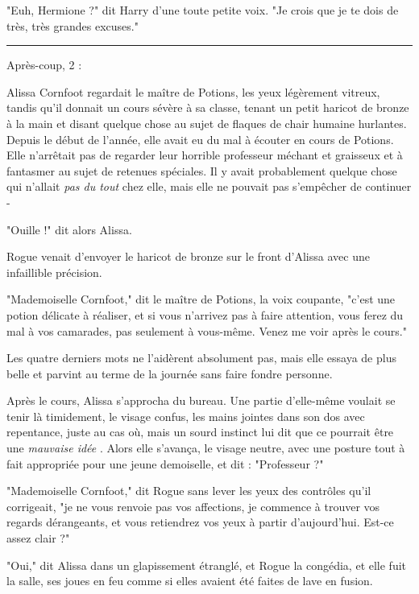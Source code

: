 "Euh, Hermione ?" dit Harry d'une toute petite voix. "Je crois que je te dois de très, très grandes excuses."
\par\noindent\rule{\textwidth}{0.4pt}
Après-coup, 2 :

Alissa Cornfoot regardait le maître de Potions, les yeux légèrement vitreux, tandis qu'il donnait un cours sévère à sa classe, tenant un petit haricot de bronze à la main et disant quelque chose au sujet de flaques de chair humaine hurlantes. Depuis le début de l'année, elle avait eu du mal à écouter en cours de Potions. Elle n'arrêtait pas de regarder leur horrible professeur méchant et graisseux et à fantasmer au sujet de retenues spéciales. Il y avait probablement quelque chose qui n'allait \emph{pas du tout}  chez elle, mais elle ne pouvait pas s'empêcher de continuer -

"Ouille !" dit alors Alissa.

Rogue venait d'envoyer le haricot de bronze sur le front d'Alissa avec une infaillible précision.

"Mademoiselle Cornfoot," dit le maître de Potions, la voix coupante, "c'est une potion délicate à réaliser, et si vous n'arrivez pas à faire attention, vous ferez du mal à vos camarades, pas seulement à vous-même. Venez me voir après le cours."

Les quatre derniers mots ne l'aidèrent absolument pas, mais elle essaya de plus belle et parvint au terme de la journée sans faire fondre personne.

Après le cours, Alissa s'approcha du bureau. Une partie d'elle-même voulait se tenir là timidement, le visage confus, les mains jointes dans son dos avec repentance, juste au cas où, mais un sourd instinct lui dit que ce pourrait être une \emph{mauvaise idée} . Alors elle s'avança, le visage neutre, avec une posture tout à fait appropriée pour une jeune demoiselle, et dit : "Professeur ?"

"Mademoiselle Cornfoot," dit Rogue sans lever les yeux des contrôles qu'il corrigeait, "je ne vous renvoie pas vos affections, je commence à trouver vos regards dérangeants, et vous retiendrez vos yeux à partir d'aujourd'hui. Est-ce assez clair ?"

"Oui," dit Alissa dans un glapissement étranglé, et Rogue la congédia, et elle fuit la salle, ses joues en feu comme si elles avaient été faites de lave en fusion.

